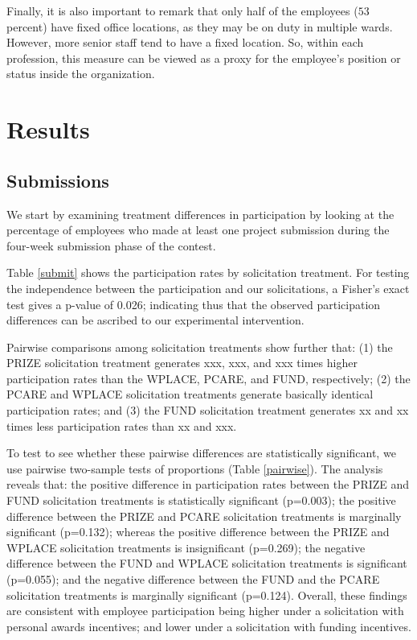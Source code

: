 \documentclass[12pt, titlepage]{article}
\begin{document}
Finally, it is also important to remark that only half of the employees
(\(53\) percent) have fixed office locations, as they may be on duty in
multiple wards. However, more senior staff tend to have a fixed
location. So, within each profession, this measure can be viewed as a
proxy for the employee's position or status inside the organization.



\section{Results}\label{results}

\subsection{Submissions}\label{submissions}

We start by examining treatment differences in participation by looking
at the percentage of employees who made at least one project submission
during the four-week submission phase of the contest.

Table \ref{submit} shows the participation rates by solicitation
treatment. For testing the independence between the participation and
our solicitations, a Fisher's exact test gives a p-value of 0.026;
indicating thus that the observed participation differences can be
ascribed to our experimental intervention.



Pairwise comparisons among solicitation treatments show further that:
(1) the PRIZE solicitation treatment generates xxx, xxx, and xxx times
higher participation rates than the WPLACE, PCARE, and FUND,
respectively; (2) the PCARE and WPLACE solicitation treatments generate
basically identical participation rates; and (3) the FUND solicitation
treatment generates xx and xx times less participation rates than xx and
xxx.



To test to see whether these pairwise differences are statistically
significant, we use pairwise two-sample tests of proportions (Table
\ref{pairwise}). The analysis reveals that: the positive difference in
participation rates between the PRIZE and FUND solicitation treatments
is statistically significant (p=0.003); the positive difference between
the PRIZE and PCARE solicitation treatments is marginally significant
(p=0.132); whereas the positive difference between the PRIZE and WPLACE
solicitation treatments is insignificant (p=0.269); the negative
difference between the FUND and WPLACE solicitation treatments is
significant (p=0.055); and the negative difference between the FUND and
the PCARE solicitation treatments is marginally significant (p=0.124).
Overall, these findings are consistent with employee participation being
higher under a solicitation with personal awards incentives; and lower
under a solicitation with funding incentives.
\end{document}
